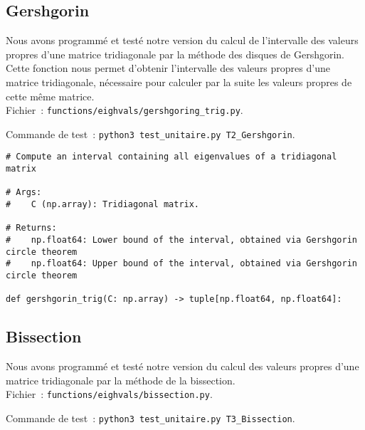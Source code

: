 \documentclass{article}
\begin{document}
\subsection{Gershgorin}

Nous avons programmé et testé notre version du calcul de l'intervalle des valeurs propres d'une matrice tridiagonale par la méthode des disques de Gershgorin. \\
Cette fonction nous permet d'obtenir l'intervalle des valeurs propres d'une matrice tridiagonale, nécessaire pour calculer par la suite les valeurs propres de cette même matrice. \\

Fichier~: \texttt{functions/eighvals/gershgoring\_trig.py}.

Commande de test~: \texttt{python3 test\_unitaire.py T2\_Gershgorin}.

\begin{small}
\begin{verbatim}
# Compute an interval containing all eigenvalues of a tridiagonal matrix

# Args:
#    C (np.array): Tridiagonal matrix.

# Returns:
#    np.float64: Lower bound of the interval, obtained via Gershgorin circle theorem
#    np.float64: Upper bound of the interval, obtained via Gershgorin circle theorem

def gershgorin_trig(C: np.array) -> tuple[np.float64, np.float64]:
\end{verbatim}
\end{small}

\subsection{Bissection}

Nous avons programmé et testé notre version du calcul des valeurs propres d'une matrice tridiagonale par la méthode de la bissection. \\

Fichier~: \texttt{functions/eighvals/bissection.py}.

Commande de test~: \texttt{python3 test\_unitaire.py T3\_Bissection}.
\end{document}
